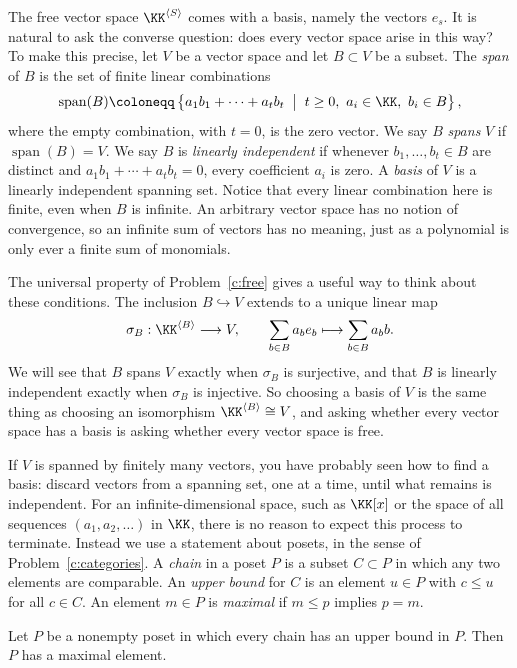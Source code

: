\documentclass[12pt,reqno]{amsart}
\begin{document}
The free vector space $\KK^{\langle S\rangle}$ comes with a basis, namely the vectors $e_s$. It is natural to ask the converse question: does every vector space arise in this way? To make this precise, let $V$ be a vector space and let $B\subset V$ be a subset. The \emph{span} of $B$ is the set of finite linear combinations
\[
\operatorname{span}(B)\coloneqq\left\{a_1b_1+\cdots+a_tb_t \;\; \big| \;\; t\geq0,\ a_i\in\KK,\ b_i\in B\right\},
\]
where the empty combination, with $t=0$, is the zero vector. We say $B$ \emph{spans} $V$ if $\operatorname{span}(B)=V$. We say $B$ is \emph{linearly independent} if whenever $b_1,\ldots,b_t\in B$ are distinct and $a_1b_1+\cdots+a_tb_t=0$, every coefficient $a_i$ is zero. A \emph{basis} of $V$ is a linearly independent spanning set. Notice that every linear combination here is finite, even when $B$ is infinite. An arbitrary vector space has no notion of convergence, so an infinite sum of vectors has no meaning, just as a polynomial is only ever a finite sum of monomials.

The universal property of Problem~\ref{c:free} gives a useful way to think about these conditions. The inclusion $B\hookrightarrow V$ extends to a unique linear map
\[
\sigma_B:\KK^{\langle B\rangle}\longrightarrow V,\qquad \sum_{b\in B}a_be_b\longmapsto\sum_{b\in B}a_bb.
\]
We will see that $B$ spans $V$ exactly when $\sigma_B$ is surjective, and that $B$ is linearly independent exactly when $\sigma_B$ is injective. So choosing a basis of $V$ is the same thing as choosing an isomorphism $\KK^{\langle B\rangle}\cong V$, and asking whether every vector space has a basis is asking whether every vector space is free.

If $V$ is spanned by finitely many vectors, you have probably seen how to find a basis: discard vectors from a spanning set, one at a time, until what remains is independent. For an infinite-dimensional space, such as $\KK[x]$ or the space of all sequences $(a_1,a_2,\ldots)$ in $\KK$, there is no reason to expect this process to terminate. Instead we use a statement about posets, in the sense of Problem~\ref{c:categories}. A \emph{chain} in a poset $P$ is a subset $C\subset P$ in which any two elements are comparable. An \emph{upper bound} for $C$ is an element $u\in P$ with $c\leq u$ for all $c\in C$. An element $m\in P$ is \emph{maximal} if $m\leq p$ implies $p=m$.

\begin{theorem}
Let $P$ be a nonempty poset in which every chain has an upper bound in $P$. Then $P$ has a maximal element.
\end{theorem}
\end{document}
